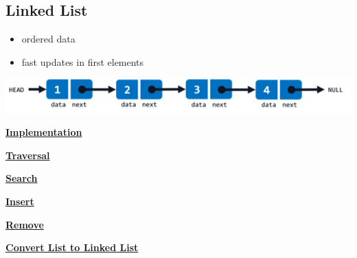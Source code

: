 \subsection{Linked List}
    \begin{itemize}
        \item ordered data
        \item fast updates in first elements
    \end{itemize}
    \includegraphics*[width = 0.9\linewidth]{src/4_data_structure/images/linked_list.png}

    {\centering\underline{\textbf{Implementation}} \par}
        

    {\centering\underline{\textbf{Traversal}} \par}
        

    {\centering\underline{\textbf{Search}} \par}
        

    {\centering\underline{\textbf{Insert}} \par}
        

    {\centering\underline{\textbf{Remove}} \par}
        
    
    {\centering\underline{\textbf{Convert List to Linked List}} \par}
        